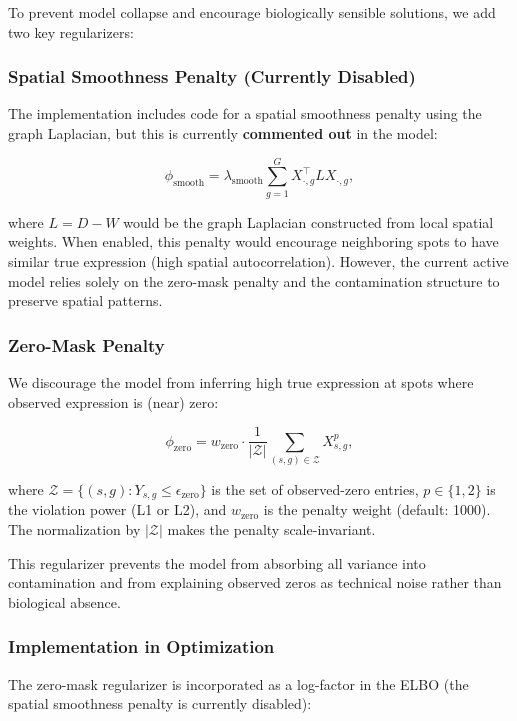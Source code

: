 \documentclass[11pt]{article}
\begin{document}
To prevent model collapse and encourage biologically sensible solutions, we add two key regularizers:

\subsubsection{Spatial Smoothness Penalty (Currently Disabled)}

The implementation includes code for a spatial smoothness penalty using the graph Laplacian, but this is currently \textbf{commented out} in the model:

\[
\phi_{\text{smooth}} = \lambda_{\text{smooth}} \sum_{g=1}^{G} X_{\cdot,g}^{\top} L X_{\cdot,g},
\]

where $L = D - W$ would be the graph Laplacian constructed from local spatial weights. When enabled, this penalty would encourage neighboring spots to have similar true expression (high spatial autocorrelation). However, the current active model relies solely on the zero-mask penalty and the contamination structure to preserve spatial patterns.

\subsubsection{Zero-Mask Penalty}

We discourage the model from inferring high true expression at spots where observed expression is (near) zero:

\[
\phi_{\text{zero}} = w_{\text{zero}} \cdot \frac{1}{|\mathcal{Z}|} \sum_{(s,g) \in \mathcal{Z}} X_{s,g}^p,
\]

where $\mathcal{Z} = \{(s,g) : Y_{s,g} \le \epsilon_{\text{zero}}\}$ is the set of observed-zero entries, $p \in \{1,2\}$ is the violation power (L1 or L2), and $w_{\text{zero}}$ is the penalty weight (default: 1000). The normalization by $|\mathcal{Z}|$ makes the penalty scale-invariant.

This regularizer prevents the model from absorbing all variance into contamination and from explaining observed zeros as technical noise rather than biological absence.

\subsubsection{Implementation in Optimization}

The zero-mask regularizer is incorporated as a log-factor in the ELBO (the spatial smoothness penalty is currently disabled):
\end{document}
